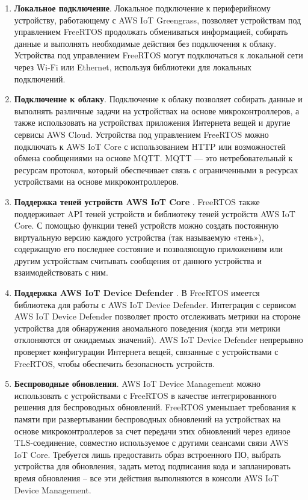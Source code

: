 \begin{enumerate}[label*=\arabic*.]
	\item \textbf{Локальное подключение}. \newline
	Локальное подключение к периферийному устройству, работающему с AWS IoT Greengrass, позволяет устройствам под управлением FreeRTOS продолжать обмениваться информацией, собирать данные и выполнять необходимые действия без подключения к облаку. Устройства под управлением FreeRTOS могут подключаться к локальной сети через Wi-Fi или Ethernet, используя библиотеки для локальных подключений.
	
	\item \textbf{Подключение к облаку}. \newline
	Подключение к облаку позволяет собирать данные и выполнять различные задачи на устройствах на основе микроконтроллеров, а также использовать на устройствах приложения Интернета вещей и другие сервисы AWS Cloud. Устройства под управлением FreeRTOS можно подключать к AWS IoT Core \cite{Amazon_FreeRTOS_core} с использованием HTTP или возможностей обмена сообщениями на основе MQTT. MQTT --- это нетребовательный к ресурсам протокол, который обеспечивает связь с ограниченными в ресурсах устройствами на основе микроконтроллеров.
	
	\item \textbf{Поддержка теней устройств AWS IoT Core} \cite{Amazon_FreeRTOS_core}. \newline
	FreeRTOS также поддерживает API теней устройств и библиотеку теней устройств AWS IoT Core. С помощью функции теней устройств можно создать постоянную виртуальную версию каждого устройства (так называемую «тень»), содержащую его последнее состояние и позволяющую приложениям или другим устройствам считывать сообщения от данного устройства и взаимодействовать с ним.
	
	\item \textbf{Поддержка AWS IoT Device Defender} \cite{Amazon_FreeRTOS_defender}. \newline
	В FreeRTOS имеется библиотека для работы с AWS IoT Device Defender. Интеграция с сервисом AWS IoT Device Defender позволяет просто отслеживать метрики на стороне устройства для обнаружения аномального поведения (когда эти метрики отклоняются от ожидаемых значений). AWS IoT Device Defender непрерывно проверяет конфигурации Интернета вещей, связанные с устройствами с FreeRTOS, чтобы обеспечить безопасность устройств.
	
	\item \textbf{Беспроводные обновления}. \newline
	AWS IoT Device Management \cite{Amazon_FreeRTOS_management} можно использовать с устройствами с FreeRTOS в качестве интегрированного решения для беспроводных обновлений. FreeRTOS уменьшает требования к памяти при развертывании беспроводных обновлений на устройствах на основе микроконтроллеров за счет передачи этих обновлений через единое TLS-соединение, совместно используемое с другими сеансами связи AWS IoT Core. Требуется лишь предоставить образ встроенного ПО, выбрать устройства для обновления, задать метод подписания кода и запланировать время обновления – все эти действия выполняются в консоли AWS IoT Device Management.
	

\end{enumerate}
